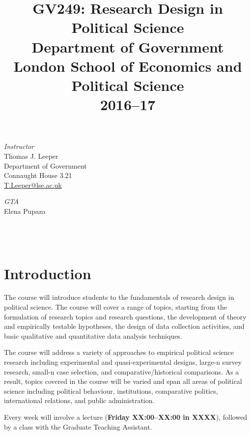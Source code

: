 \documentclass[12pt,a4paper]{article}
\title{\textbf{GV249: Research Design in Political Science}\\Department of Government\\London School of Economics and Political Science\\2016--17}
\author{}
\date{}
\begin{document}
\nobibliography*
\faketableofcontents

\maketitle

\vspace{-4em}

\begin{minipage}[b]{0.5\linewidth}
\textit{Instructor}\\
Thomas J. Leeper\\
Department of Government\\
Connaught House 3.21\\
\href{mailto:t.leeper@lse.ac.uk}{T.Leeper@lse.ac.uk}\\
\end{minipage}
\begin{minipage}[b]{0.5\linewidth}
\textit{GTA}\\
Elena Pupaza\\
\hspace{1em}\\
\hspace{1em}\\
\hspace{1em}\\
\end{minipage}

\section{Introduction}
The course will introduce students to the fundamentals of research design in political science. The course will cover a range of topics, starting from the formulation of research topics and research questions, the development of theory and empirically testable hypotheses, the design of data collection activities, and basic qualitative and quantitative data analysis techniques. 

The course will address a variety of approaches to empirical political science research including experimental and quasi-experimental designs, large-n survey research, small-n case selection, and comparative/historical comparisons. As a result, topics covered in the course will be varied and span all areas of political science including political behaviour, institutions, comparative politics, international relations, and public administration.

Every week will involve a lecture (\textbf{Friday XX:00--XX:00 in XXXX}), followed by a class with the Graduate Teaching Assistant. 
\end{document}
